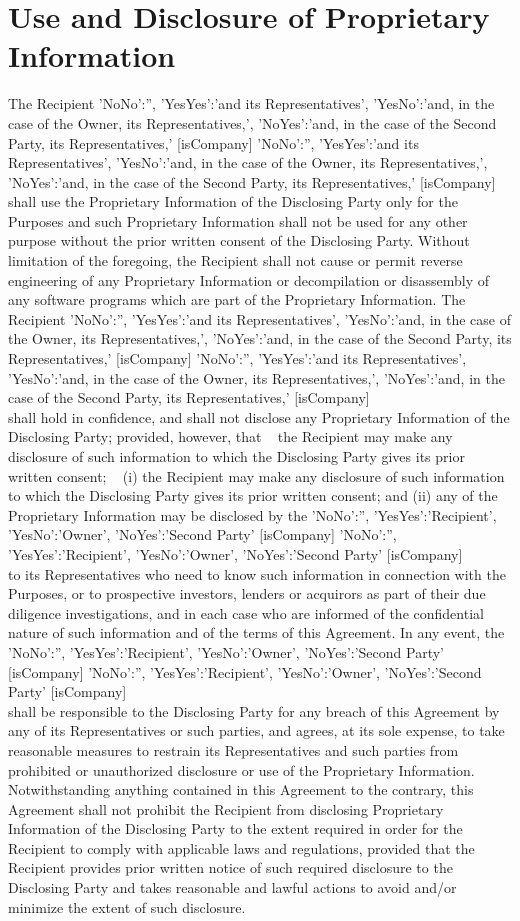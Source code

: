 \documentclass[10pt]{article}
\makeatletter
\edef\history{ }
\newcommand{\VAR}[1]{{\color{blue} #1}\g@addto@macro\history{#1\\}}
\newcommand{\BLOCK}[1]{~\newline{ \color{red}#1 }}
\newcommand{\representativesMention}[1]{
    \VAR{
        {
            'NoNo':'',
            'YesYes':'#1 its Representatives',
            'YesNo':'#1, in the case of the Owner, its Representatives,',
            'NoYes':'#1, in the case of the Second Party, its Representatives,'
        }[isCompany]
    }
}
\newcommand{\representedParty}{
    \VAR{
        {
            'NoNo':'',
            'YesYes':'Recipient',
            'YesNo':'Owner',
            'NoYes':'Second Party'
        }[isCompany]
    }
}
\makeatother
\begin{document}
\section{Use and Disclosure of Proprietary Information} \label{sec:discl}
The Recipient \representativesMention{and} shall use the Proprietary Information of the Disclosing Party only for the Purposes and such Proprietary Information shall not be used for any other purpose without the prior written consent of the Disclosing Party. Without limitation of the foregoing, the Recipient shall not cause or permit reverse engineering of any Proprietary Information or decompilation or disassembly of any software programs which are part of the Proprietary Information.
The Recipient \representativesMention{and} shall hold in confidence, and shall not disclose any Proprietary Information of the Disclosing Party; provided, however, that
\BLOCK{ if isCompany == 'NoNo' }
the Recipient may make any disclosure of such information to which the Disclosing Party gives its prior written consent;
\BLOCK{ else }
(i) the Recipient may make any disclosure of such information to which the Disclosing Party gives its prior written consent; and (ii) any of the Proprietary Information may be disclosed by the \representedParty to its Representatives who need to know such information in connection with the Purposes, or to prospective investors, lenders or acquirors as part of their due diligence investigations, and in each case who are informed of the confidential nature of such information and of the terms of this Agreement. In any event, the \representedParty shall be responsible to the Disclosing Party for any breach of this Agreement by any of its Representatives or such parties, and agrees, at its sole expense, to take reasonable measures to restrain its Representatives and such parties from prohibited or unauthorized disclosure or use of the Proprietary Information.
\BLOCK{ endif }
Notwithstanding anything contained in this Agreement to the contrary, this Agreement shall not prohibit the Recipient from disclosing Proprietary Information of the Disclosing Party to the extent required in order for the Recipient to comply with applicable laws and regulations, provided that the Recipient provides prior written notice of such required disclosure to the Disclosing Party and takes reasonable and lawful actions to avoid and/or minimize the extent of such disclosure.
\end{document}
